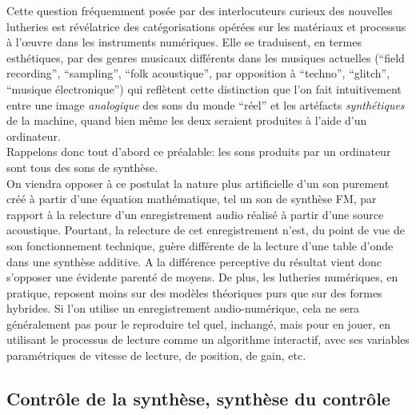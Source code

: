 \noindent {} Cette question fréquemment posée par des interlocuteurs curieux des nouvelles lutheries est révélatrice des catégorisations opérées sur les matériaux et processus à l'œuvre dans les instruments numériques. Elle se traduisent, en termes esthétiques, par des genres musicaux différents dans les musiques actuelles (``field recording'', ``sampling'', ``folk acoustique'', par opposition à ``techno'', ``glitch'', ``musique électronique'') qui reflètent cette distinction que l'on fait intuitivement entre une image \textit{analogique} des sons du monde ``réel'' et les artéfacts \textit{synthétiques} de la machine, quand bien même les deux seraient produites à l'aide d'un ordinateur.\\
\indent Rappelons donc tout d'abord ce préalable: les sons produits par un ordinateur sont tous des sons de synthèse.\\
\indent On viendra opposer à ce postulat la nature plus artificielle d'un son purement créé à partir d'une équation mathématique, tel un son de synthèse FM, par rapport à la relecture d'un enregistrement audio réalisé à partir d'une source acoustique. Pourtant, la relecture de cet enregistrement n'est, du point de vue de son fonctionnement technique, guère différente de la lecture d'une table d'onde dans une synthèse additive. A la différence perceptive du résultat vient donc s'opposer une évidente parenté de moyens. De plus, les lutheries numériques, en pratique, reposent moins sur des modèles théoriques purs que sur des formes hybrides. Si l'on utilise un enregistrement audio-numérique, cela ne sera généralement pas pour le reproduire tel quel, inchangé, mais pour en jouer, en utilisant le processus de lecture comme un algorithme interactif, avec ses variables paramétriques de vitesse de lecture, de position, de gain, etc.

\subsection{Contrôle de la synthèse, synthèse du contrôle}

